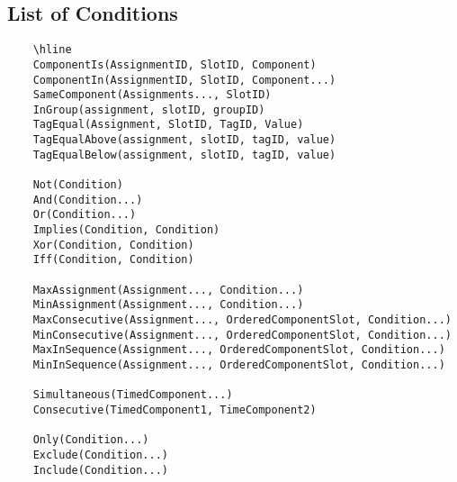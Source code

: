 \subsection{List of Conditions}
	
\def\arraystretch{1.5}
\begin{lstlisting}
	\hline
	ComponentIs(AssignmentID, SlotID, Component)	
	ComponentIn(AssignmentID, SlotID, Component...)	
	SameComponent(Assignments..., SlotID)	
	InGroup(assignment, slotID, groupID)	
	TagEqual(Assignment, SlotID, TagID, Value)	
	TagEqualAbove(assignment, slotID, tagID, value)	
	TagEqualBelow(assignment, slotID, tagID, value)	
	
	Not(Condition)	
	And(Condition...)	
	Or(Condition...)	
	Implies(Condition, Condition)	
	Xor(Condition, Condition)	
	Iff(Condition, Condition)	

	MaxAssignment(Assignment..., Condition...)	
	MinAssignment(Assignment..., Condition...)	
	MaxConsecutive(Assignment..., OrderedComponentSlot, Condition...)	
	MinConsecutive(Assignment..., OrderedComponentSlot, Condition...)	
	MaxInSequence(Assignment..., OrderedComponentSlot, Condition...)	
	MinInSequence(Assignment..., OrderedComponentSlot, Condition...)	

	Simultaneous(TimedComponent...) 
	Consecutive(TimedComponent1, TimeComponent2) 

	Only(Condition...) 
	Exclude(Condition...) 
	Include(Condition...)
\end{lstlisting}

